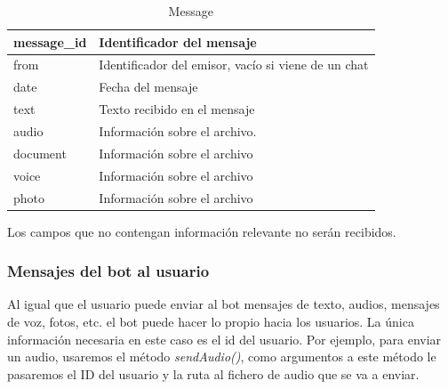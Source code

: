 \documentclass[10pt,journal,compsoc]{IEEEtran}
\begin{document}
\begin{itemize}
   \begin{table}[h]
  \centering
  \begin{tabular}{>{\centering\arraybackslash}m{1cm} >{\centering\arraybackslash}m{4cm}}
  message\_id  & Identificador del mensaje \\ \hline
  from & Identificador del emisor, vacío si viene de un chat \\ \hline
  date & Fecha del mensaje \\ \hline
  text & Texto recibido en el mensaje \\ \hline
  audio & Información sobre el archivo. \\ \hline
  document & Información sobre el archivo \\ \hline
  voice & Información sobre el archivo \\ \hline
  photo & Información sobre el archivo \\ \hline
  \end{tabular} 
  \caption{Message}
  \label{tab:Message}
  \end{table}

\end{itemize}
Los campos que no contengan información relevante no serán recibidos.

\subsubsection{Mensajes del bot al usuario}
Al igual que el usuario puede enviar al bot mensajes de texto, audios, mensajes 
de voz, fotos, etc. el bot puede hacer lo propio hacia los usuarios. La única 
información necesaria en este caso es el id del usuario.
Por ejemplo, para enviar un audio, usaremos el método \textit{sendAudio()}, como 
argumentos a este método le pasaremos el ID del usuario y la ruta al fichero de 
audio que se va a enviar.
\end{document}
